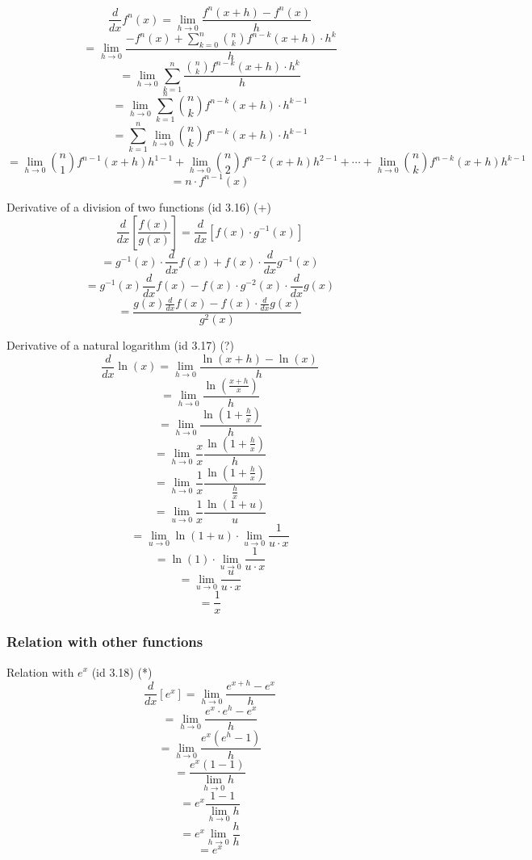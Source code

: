 \documentclass{book}
\begin{document}
                    \[\frac{d}{dx} f^n(x) = \lim_{h \rightarrow 0} \frac{f^n(x + h) - f^n(x)}{h}\]
                    \[= \lim_{h \rightarrow 0} \frac{-f^n(x) + \sum^n_{k=0} \binom{n}{k} f^{n - k}(x + h) \cdot h^k}{h}\]
                    \[= \lim_{h \rightarrow 0} \sum^n_{k=1} \frac{\binom{n}{k} f^{n - k}(x + h) \cdot h^k}{h}\]
                    \[= \lim_{h \rightarrow 0} \sum^n_{k=1} \binom{n}{k} f^{n - k}(x + h) \cdot h^{k - 1}\]
                    \[= \sum^n_{k=1} \lim_{h \rightarrow 0} \binom{n}{k} f^{n - k} (x + h) \cdot h^{k - 1}\]
                    \[= \lim_{h \rightarrow 0} \binom{n}{1} f^{n - 1}(x + h) h^{1 - 1} + \lim_{h \rightarrow 0} \binom{n}{2} f^{n - 2}(x + h) h^{2 - 1} + \cdots + \lim_{h \rightarrow 0}\binom{n}{k} f^{n - k}(x + h) h^{k - 1}\]
                    \[= n \cdot f^{n - 1}(x)\]

                    Derivative of a division of two functions (id 3.16) (+)
                    \[\frac{d}{dx} \left[\frac{f(x)}{g(x)}\right] = \frac{d}{dx} [f(x) \cdot g^{-1}(x)]\]
                    \[= g^{-1}(x) \cdot \frac{d}{dx}f(x) + f(x) \cdot \frac{d}{dx} g^{-1}(x)\]
                    \[= g^{-1}(x) \frac{d}{dx} f(x) - f(x) \cdot g^{-2}(x) \cdot \frac{d}{dx}g(x)\]
                    \[= \frac{g(x) \frac{d}{dx} f(x) - f(x) \cdot \frac{d}{dx} g(x)}{g^2(x)}\]

                    Derivative of a natural logarithm (id 3.17) (?)
                    \[\frac{d}{dx} \ln(x) = \lim_{h \rightarrow 0} \frac{\ln(x + h) -\ln(x)}{h}\]
                    \[= \lim_{h \rightarrow 0} \frac{\ln\left(\frac{x + h}{x} \right)}{h}\]
                    \[= \lim_{h \rightarrow 0} \frac{\ln \left(1 + \frac{h}{x} \right)}{h}\]
                    \[= \lim_{h \rightarrow 0} \frac{x}{x} \frac{\ln \left(1 + \frac{h}{x} \right)}{h}\]
                    \[= \lim_{h \rightarrow 0} \frac{1}{x} \frac{\ln(1 + \frac{h}{x})}{\frac{h}{x}}\]
                    \[= \lim_{u \rightarrow 0} \frac{1}{x} \frac{\ln(1 + u)}{u}\]
                    \[= \lim_{u \rightarrow 0} \ln(1 + u) \cdot \lim_{u \rightarrow 0} \frac{1}{u \cdot x}\]
                    \[= \ln(1) \cdot \lim_{u  \rightarrow 0} \frac{1}{u \cdot x}\]
                    \[= \lim_{u \rightarrow 0} \frac{u}{u \cdot x}\]
                    \[= \frac{1}{x}\]

                \subsubsection{Relation with other functions}
                    Relation with $e^x$ (id 3.18) (*)
                    \[\frac{d}{dx}[e^x] = \lim_{h \rightarrow 0} \frac{e^{x + h} - e^x}{h}\]
                    \[= \lim_{h \rightarrow 0} \frac{e^x \cdot e^h - e^x}{h}\]
                    \[= \lim_{h \rightarrow 0} \frac{e^x (e^h - 1)}{h}\]
                    \[= \frac{e^x(1 - 1)}{\lim_{h \rightarrow 0} h}\]
                    \[= e^x \frac{1 - 1}{\lim_{h \rightarrow 0} h}\]
                    \[= e^x \lim_{h \rightarrow 0} \frac{h}{h}\]
                    \[= e^x\]
\end{document}
